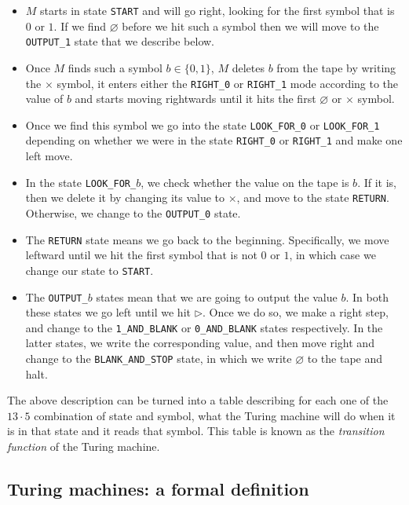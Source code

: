 \begin{itemize}
\item
  \(M\) starts in state \texttt{START} and will go right, looking for
  the first symbol that is \(0\) or \(1\). If we find \(\varnothing\)
  before we hit such a symbol then we will move to the
  \texttt{OUTPUT\_1} state that we describe below.
\item
  Once \(M\) finds such a symbol \(b \in \{0,1\}\), \(M\) deletes \(b\)
  from the tape by writing the \(\times\) symbol, it enters either the
  \texttt{RIGHT\_0} or \texttt{RIGHT\_1} mode according to the value of
  \(b\) and starts moving rightwards until it hits the first
  \(\varnothing\) or \(\times\) symbol.
\item
  Once we find this symbol we go into the state \texttt{LOOK\_FOR\_0} or
  \texttt{LOOK\_FOR\_1} depending on whether we were in the state
  \texttt{RIGHT\_0} or \texttt{RIGHT\_1} and make one left move.
\item
  In the state \texttt{LOOK\_FOR\_}\(b\), we check whether the value on
  the tape is \(b\). If it is, then we delete it by changing its value
  to \(\times\), and move to the state \texttt{RETURN}. Otherwise, we
  change to the \texttt{OUTPUT\_0} state.
\item
  The \texttt{RETURN} state means we go back to the beginning.
  Specifically, we move leftward until we hit the first symbol that is
  not \(0\) or \(1\), in which case we change our state to
  \texttt{START}.
\item
  The \texttt{OUTPUT\_}\(b\) states mean that we are going to output the
  value \(b\). In both these states we go left until we hit
  \(\triangleright\). Once we do so, we make a right step, and change to
  the \texttt{1\_AND\_BLANK} or \texttt{0\_AND\_BLANK} states
  respectively. In the latter states, we write the corresponding value,
  and then move right and change to the \texttt{BLANK\_AND\_STOP} state,
  in which we write \(\varnothing\) to the tape and halt.
\end{itemize}

The above description can be turned into a table describing for each one
of the \(13\cdot 5\) combination of state and symbol, what the Turing
machine will do when it is in that state and it reads that symbol. This
table is known as the \emph{transition function} of the Turing machine.

\subsection{Turing machines: a formal
definition}\label{Turing-machines-a-formal-}


